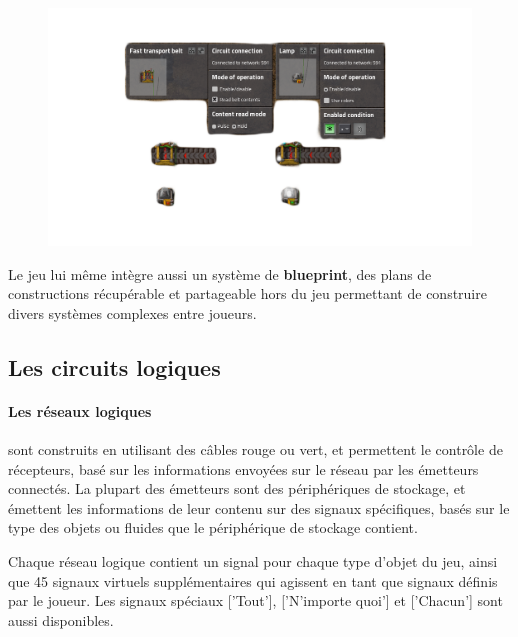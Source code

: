 \documentclass{scrreprt}
\begin{document}
    	
    	\begin{figure}[h]
    		\centering
    		\includegraphics[width=0.8\linewidth]{pics/factorio-logic-basis.png}
    		
    	\end{figure}
    	
    	Le jeu lui même intègre aussi un système de \textbf{blueprint}, des plans de constructions récupérable et partageable hors du jeu permettant de construire divers systèmes complexes entre joueurs.
    	
    	
    	\subsection{Les circuits logiques}
    	
    	\paragraph{Les réseaux logiques} 
    	sont construits en utilisant des câbles rouge ou vert, et permettent le contrôle de récepteurs, basé sur les informations envoyées sur le réseau par les émetteurs connectés. 
    	La plupart des émetteurs sont des périphériques de stockage, et émettent les informations de leur contenu sur des signaux spécifiques, basés sur le type des objets ou fluides que le périphérique de stockage contient. 
    	
    	Chaque réseau logique contient un signal pour chaque type d'objet du jeu, ainsi que 45 signaux virtuels supplémentaires qui agissent en tant que signaux définis par le joueur. 
    	Les signaux spéciaux ['Tout'], ['N'importe quoi'] et ['Chacun'] sont aussi disponibles.
    	
    	
\end{document}
